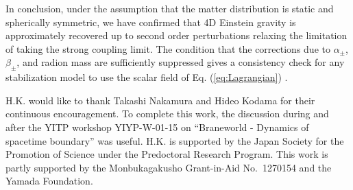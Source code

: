 \documentclass[a4paper,showpacs,preprintnumbers,amsmath,amssymb]{revtex4}
\begin{document}
In conclusion, under the assumption that the matter distribution is static and spherically symmetric, we have confirmed that 4D Einstein gravity is approximately recovered up to second order perturbations relaxing the limitation of taking the strong coupling limit. 
The condition that the corrections due to $\alpha_\pm$, $\beta_\pm$, and radion mass are sufficiently suppressed gives a consistency check for any stabilization model to use the scalar field of Eq. (\ref{eq:Lagrangian}) \cite{Gibbons:2001tf}.



\begin{acknowledgments}
H.K. would like to thank Takashi Nakamura and Hideo Kodama for their continuous encouragement. To complete this work, the discussion during and after the YITP workshop YIYP-W-01-15 on ``Braneworld - Dynamics of spacetime boundary'' was useful. 
H.K. is supported by the Japan Society for the Promotion of Science under the Predoctoral Research Program. 
This work is partly supported by the Monbukagakusho Grant-in-Aid No.~1270154  and the Yamada Foundation. 



\end{acknowledgments} 









\appendix
\end{document}
